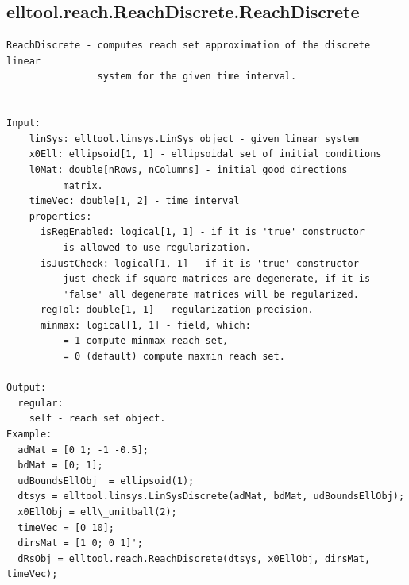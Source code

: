 \documentclass[letterpaper,10pt,english]{sphinxmanual}
\begin{document}
\subsection{elltool.reach.ReachDiscrete.ReachDiscrete}
\label{chap_functions:elltool-reach-reachdiscrete-reachdiscrete}
\begin{Verbatim}[commandchars=\\\{\}]
ReachDiscrete - computes reach set approximation of the discrete linear
                system for the given time interval.


Input:
    linSys: elltool.linsys.LinSys object - given linear system
    x0Ell: ellipsoid[1, 1] - ellipsoidal set of initial conditions
    l0Mat: double[nRows, nColumns] - initial good directions
          matrix.
    timeVec: double[1, 2] - time interval
    properties:
      isRegEnabled: logical[1, 1] - if it is 'true' constructor
          is allowed to use regularization.
      isJustCheck: logical[1, 1] - if it is 'true' constructor
          just check if square matrices are degenerate, if it is
          'false' all degenerate matrices will be regularized.
      regTol: double[1, 1] - regularization precision.
      minmax: logical[1, 1] - field, which:
          = 1 compute minmax reach set,
          = 0 (default) compute maxmin reach set.

Output:
  regular:
    self - reach set object.
Example:
  adMat = [0 1; -1 -0.5];
  bdMat = [0; 1];
  udBoundsEllObj  = ellipsoid(1);
  dtsys = elltool.linsys.LinSysDiscrete(adMat, bdMat, udBoundsEllObj);
  x0EllObj = ell\_unitball(2);
  timeVec = [0 10];
  dirsMat = [1 0; 0 1]';
  dRsObj = elltool.reach.ReachDiscrete(dtsys, x0EllObj, dirsMat, timeVec);
\end{Verbatim}
\end{document}
